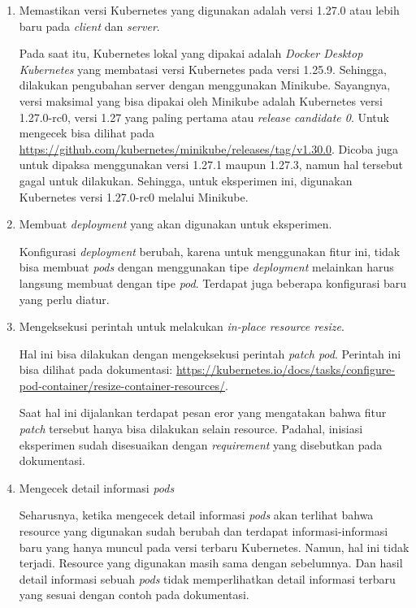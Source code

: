 \begin{enumerate}
    \item Memastikan versi Kubernetes yang digunakan adalah versi 1.27.0 atau lebih baru pada \textit{client} dan \textit{server}.
    
    Pada saat itu, Kubernetes lokal yang dipakai adalah \textit{Docker Desktop Kubernetes} yang membatasi versi Kubernetes pada versi 1.25.9. Sehingga, dilakukan pengubahan server dengan menggunakan Minikube. Sayangnya, versi maksimal yang bisa dipakai oleh Minikube adalah Kubernetes versi 1.27.0-rc0, versi 1.27 yang paling pertama atau \textit{release candidate 0}. Untuk mengecek bisa dilihat pada \url{https://github.com/kubernetes/minikube/releases/tag/v1.30.0}. Dicoba juga untuk dipaksa menggunakan versi 1.27.1 maupun 1.27.3, namun hal tersebut gagal untuk dilakukan. Sehingga, untuk eksperimen ini, digunakan Kubernetes versi 1.27.0-rc0 melalui Minikube.

    \item Membuat \textit{deployment} yang akan digunakan untuk eksperimen.
    
    Konfigurasi \textit{deployment} berubah, karena untuk menggunakan fitur ini, tidak bisa membuat \textit{pods} dengan menggunakan tipe \textit{deployment} melainkan harus langsung membuat dengan tipe \textit{pod}. Terdapat juga beberapa konfigurasi baru yang perlu diatur.

    \item Mengeksekusi perintah untuk melakukan \textit{in-place resource resize}.
    
    Hal ini bisa dilakukan dengan mengeksekusi perintah \textit{patch pod}. Perintah ini bisa dilihat pada dokumentasi: \url{https://kubernetes.io/docs/tasks/configure-pod-container/resize-container-resources/}.

    Saat hal ini dijalankan terdapat pesan eror yang mengatakan bahwa fitur \textit{patch} tersebut hanya bisa dilakukan selain resource. Padahal, inisiasi eksperimen sudah disesuaikan dengan \textit{requirement} yang disebutkan pada dokumentasi.

    \item Mengecek detail informasi \textit{pods}
    
    Seharusnya, ketika mengecek detail informasi \textit{pods} akan terlihat bahwa resource yang digunakan sudah berubah dan terdapat informasi-informasi baru yang hanya muncul pada versi terbaru Kubernetes. Namun, hal ini tidak terjadi. Resource yang digunakan masih sama dengan sebelumnya. Dan hasil detail informasi sebuah \textit{pods} tidak memperlihatkan detail informasi terbaru yang sesuai dengan contoh pada dokumentasi.
\end{enumerate}

